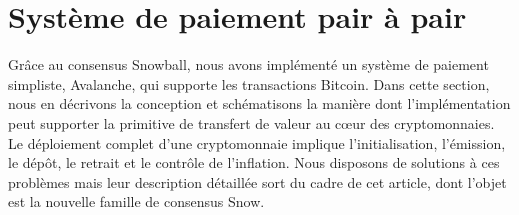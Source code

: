 \documentclass[letterpaper,twocolumn,10pt]{article}
\newcommand{\tronly}[2]{#1}
\theoremstyle{definition}
\begin{document}



\section{Système de paiement pair à pair}
\label{sec:implementation}


Grâce au consensus Snowball, nous avons implémenté un système de paiement simpliste, Avalanche, qui supporte les transactions Bitcoin. Dans cette section, nous en décrivons la conception et schématisons la manière dont l'implémentation peut supporter la primitive de transfert de valeur au cœur des cryptomonnaies.
Le déploiement complet d'une cryptomonnaie implique l'initialisation, l'émission, le dépôt, le retrait et le contrôle de l'inflation. Nous disposons de solutions à ces problèmes mais leur description détaillée sort du cadre de cet article, dont l'objet est la nouvelle famille de consensus Snow. %
\end{document}
